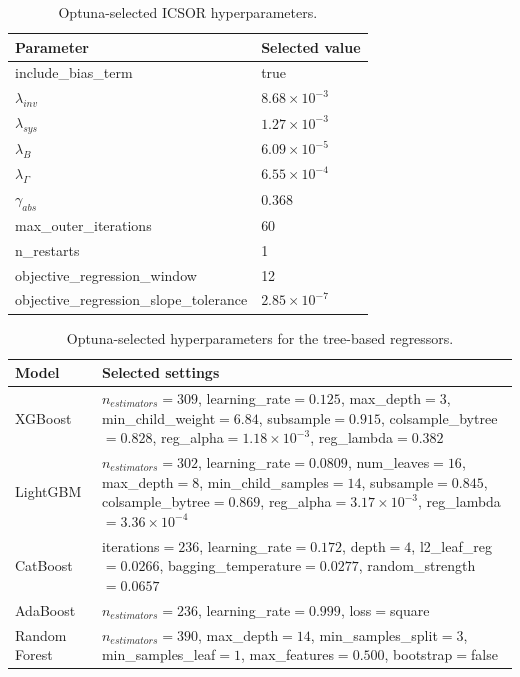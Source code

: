\documentclass[a4paper,fleqn]{cas-sc}
\newenvironment{revblock}{\begingroup\color{revDefault}}{\endgroup}
\newenvironment{revblockr24}{\begingroup\color{revRtwoFour}}{\endgroup}
\begin{document}
\begin{revblock}
\begin{revblockr24}
\begin{table}[H]
\centering
\caption{Optuna-selected ICSOR hyperparameters.}
\label{tab:optuna_icsor}
\scriptsize
\begin{tabular}{ll}
\hline
Parameter & Selected value \\
\hline
include\_bias\_term & true \\
$\lambda_{inv}$ & $8.68 \times 10^{-3}$ \\
$\lambda_{sys}$ & $1.27 \times 10^{-3}$ \\
$\lambda_B$ & $6.09 \times 10^{-5}$ \\
$\lambda_{\Gamma}$ & $6.55 \times 10^{-4}$ \\
$\gamma_{abs}$ & 0.368 \\
max\_outer\_iterations & 60 \\
n\_restarts & 1 \\
objective\_regression\_window & 12 \\
objective\_regression\_slope\_tolerance & $2.85 \times 10^{-7}$ \\
\hline
\end{tabular}
\end{table}

\begin{table}[H]
\centering
\caption{Optuna-selected hyperparameters for the tree-based regressors.}
\label{tab:optuna_classical_a}
\scriptsize
\begin{tabular}{>{\raggedright\arraybackslash}p{2.1cm}>{\raggedright\arraybackslash}p{9.0cm}}
\hline
Model & Selected settings \\
\hline
XGBoost & $n_{estimators}=309$, learning\_rate$=0.125$, max\_depth$=3$, min\_child\_weight$=6.84$, subsample$=0.915$, colsample\_bytree$=0.828$, reg\_alpha$=1.18 \times 10^{-3}$, reg\_lambda$=0.382$ \\
LightGBM & $n_{estimators}=302$, learning\_rate$=0.0809$, num\_leaves$=16$, max\_depth$=8$, min\_child\_samples$=14$, subsample$=0.845$, colsample\_bytree$=0.869$, reg\_alpha$=3.17 \times 10^{-3}$, reg\_lambda$=3.36 \times 10^{-4}$ \\
CatBoost & iterations$=236$, learning\_rate$=0.172$, depth$=4$, l2\_leaf\_reg$=0.0266$, bagging\_temperature$=0.0277$, random\_strength$=0.0657$ \\
AdaBoost & $n_{estimators}=236$, learning\_rate$=0.999$, loss$=$square \\
Random Forest & $n_{estimators}=390$, max\_depth$=14$, min\_samples\_split$=3$, min\_samples\_leaf$=1$, max\_features$=0.500$, bootstrap$=$false \\
\hline
\end{tabular}
\end{table}


\end{revblockr24}
\end{revblock}
\end{document}
